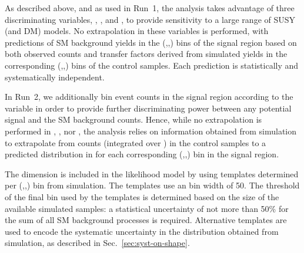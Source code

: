 As described above, and as used in Run~1, the analysis takes advantage
of three discriminating variables, \njet, \nb, and \HT, to provide
sensitivity to a large range of SUSY (and DM) models. No extrapolation
in these variables is performed, with predictions of SM background
yields in the (\njet,\nb,\HT) bins of the signal region based on both
observed counts and transfer factors derived from simulated yields in
the corresponding (\njet,\nb,\HT) bins of the control samples. Each
prediction is statistically and systematically independent.


In Run~2, we additionally bin event counts in the signal region
according to the variable \mht in order to provide further
discriminating power between any potential signal and the SM
background counts. Hence, while no extrapolation is performed in
\njet, \nb, nor \HT, the analysis relies on information obtained
from simulation to extrapolate from counts (integrated over \mht) in
the control samples to a predicted distribution in \mht for each
corresponding (\njet,\nb,\HT) bin in the signal region.

The \mht dimension is included in the likelihood model by using
templates determined per (\njet,\nb,\HT) bin from simulation. The
templates use an \mht bin width of 50\gev. The threshold of the final
\mht bin used by the templates is determined based on the size of the
available simulated samples: a statistical uncertainty of not more
than 50\% for the sum of all SM background processes is required. 
Alternative templates are used to encode
the systematic uncertainty in the \mht distribution obtained from
simulation, as described in Sec.~\ref{sec:syst-on-shape}. 


